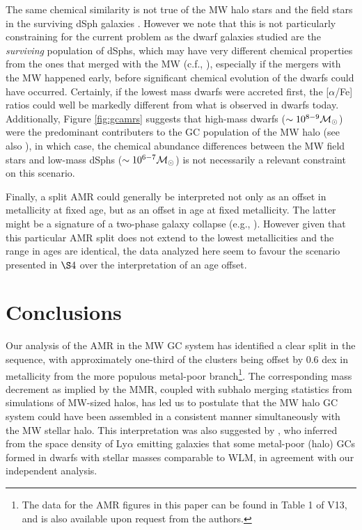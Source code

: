 \documentclass[useAMS,usenatbib]{mn2e}
\newcommand\msol{{{\cal M}_\odot}}
\begin{document}
The same chemical similarity is not true of the MW halo stars and the field
stars in the surviving dSph galaxies \citep{Venn04}.  However we note that this
is not particularly constraining for the current problem as the dwarf galaxies
studied are the \emph{surviving} population of dSphs, which may have very
different chemical properties from the ones that merged with the MW (c.f.,
\citealt{Gilmore98}), especially if the mergers with the MW happened early,
before significant chemical evolution of the dwarfs could have occurred.
Certainly, if the lowest mass dwarfs were accreted first, the [$\alpha$/Fe]
ratios could well be markedly different from what is observed in dwarfs today.
Additionally, Figure \ref{fig:gcamrs} suggests that high-mass dwarfs
($\sim 10^{8-9} \msol$) were the predominant contributers to the GC population
of the MW halo (see also \citealt{Cooper13}), in which case,
the chemical abundance differences between the
MW field stars and low-mass dSphs ($\sim 10^{6-7} \msol$) is not necessarily a
relevant constraint on this scenario.

Finally, a split AMR could generally be interpreted not only as an offset in 
metallicity at fixed age, but as an offset in age at fixed metallicity.  The 
latter might be a signature of a two-phase galaxy 
collapse (e.g., \citealt{Hartwick09}).
However given that this particular AMR split does not extend to the
lowest metallicities and the range in ages are identical, the data analyzed here
 seem to favour the scenario presented in $\S4$ over the interpretation of an age offset.

\section{Conclusions}
Our analysis of the AMR in the MW GC system has identified a clear split in the
sequence, with approximately one-third of the clusters being offset by $0.6$
dex in metallicity from the more populous metal-poor branch\footnote{The data for the AMR figures 
in this paper can be found in Table 1 of V13, 
and is also available upon request from the authors.}.  The corresponding
mass decrement as implied by the MMR, coupled with subhalo merging statistics
from simulations of MW-sized halos, has led us to postulate that the MW halo GC
system could have been assembled in a consistent manner simultaneously with the
MW stellar halo.  This interpretation was also suggested by \cite{Elmegreen12},
who inferred from the space density of Ly$\alpha$ emitting galaxies that some
metal-poor (halo) GCs formed in dwarfs with stellar masses comparable to WLM,
in agreement with our independent analysis.
\end{document}

